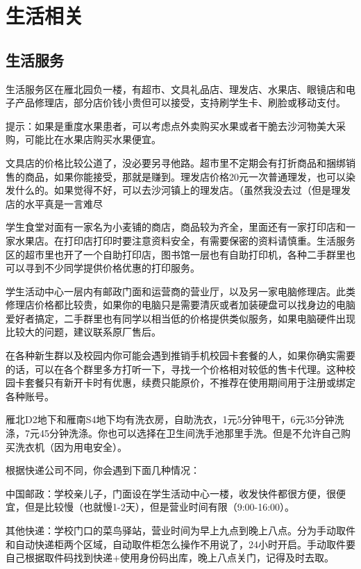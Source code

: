\section{生活相关}

\subsection{生活服务}


生活服务区在雁北园负一楼，有超市、文具礼品店、理发店、水果店、眼镜店和电子产品修理店，部分店价钱小贵但可以接受，支持刷学生卡、刷脸或移动支付。

提示：如果是重度水果患者，可以考虑点外卖购买水果或者干脆去沙河物美大采购，可能比在水果店购买水果便宜。

文具店的价格比较公道了，没必要另寻他路。超市里不定期会有打折商品和捆绑销售的商品，如果你能接受，那就是赚到。理发店价格20元一次普通理发，也可以染发什么的。如果觉得不好，可以去沙河镇上的理发店。（虽然我没去过（但是理发店的水平真是一言难尽

学生食堂对面有一家名为小麦铺的商店，商品较为齐全，里面还有一家打印店和一家水果店。在打印店打印时要注意资料安全，有需要保密的资料请慎重。生活服务区的超市里也开了一个自助打印店，图书馆一层也有自助打印机，各种二手群里也可以寻到不少同学提供价格优惠的打印服务。

学生活动中心一层内有邮政门面和运营商的营业厅，以及另一家电脑修理店。此类修理店价格都比较贵，如果你的电脑只是需要清灰或者加装硬盘可以找身边的电脑爱好者搞定，二手群里也有同学以相当低的价格提供类似服务，如果电脑硬件出现比较大的问题，建议联系原厂售后。

在各种新生群以及校园内你可能会遇到推销手机校园卡套餐的人，如果你确实需要的话，可以在各个群里多方打听一下，寻找一个价格相对较低的售卡代理。这种校园卡套餐只有新开卡时有优惠，续费只能原价，不推荐在使用期间用于注册或绑定各种账号。


雁北D2地下和雁南S4地下均有洗衣房，自助洗衣，1元5分钟甩干，6元35分钟洗涤，7元45分钟洗涤。你也可以选择在卫生间洗手池那里手洗。但是不允许自己购买洗衣机（因为用电安全）。


根据快递公司不同，你会遇到下面几种情况：

中国邮政：学校亲儿子，门面设在学生活动中心一楼，收发快件都很方便，很便宜，但是比较慢（也就慢1-2天），但是营业时间有限（9:00-16:00）。

其他快递：学校门口的菜鸟驿站，营业时间为早上九点到晚上八点。分为手动取件和自动快递柜两个区域，自动取件柜怎么操作不用说了，24小时开启。手动取件要自己根据取件码找到快递+使用身份码出库，晚上八点关门，记得及时去取。


